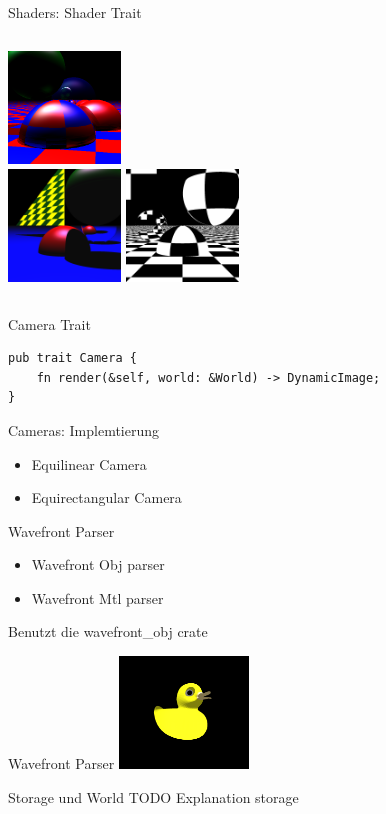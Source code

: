 \documentclass[aspectratio=169]{beamer}
\begin{document}
\begin{frame}{Shaders: Shader Trait}
    \begin{columns}[t]
        \centering
        \includegraphics[height=3cm]{example-true-ambiant} \\
        \includegraphics[height=3cm]{example-mirror}
        \centering
        \includegraphics[height=3cm]{example-mirror2}
    \end{columns}
\end{frame}
\begin{frame}[fragile]{Camera Trait}
    \begin{lstlisting}
pub trait Camera {
    fn render(&self, world: &World) -> DynamicImage;
}
    \end{lstlisting}
\end{frame}
\begin{frame}{Cameras: Implemtierung}
    \begin{itemize}[<+->]
        \item Equilinear Camera
        \item Equirectangular Camera
    \end{itemize}
\end{frame}
\begin{frame}{Wavefront Parser}
    \begin{itemize}[<+->]
        \item Wavefront Obj parser
        \item Wavefront Mtl parser
    \end{itemize}
    Benutzt die wavefront\_obj crate
\end{frame}
\begin{frame}{Wavefront Parser}
    \includegraphics[height=3cm]{example-duck}
\end{frame}
\begin{frame}{Storage und World}
    TODO Explanation storage
\end{frame}
\end{document}
